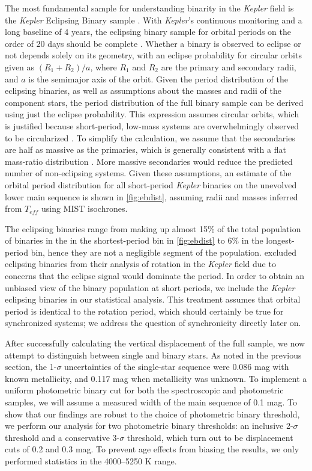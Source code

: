 \documentclass[manuscript]{aastex6}
\newcommand{\Kepler}{\mbox{\textit{Kepler}}}
\newcommand{\Teff}{\ensuremath{T_{eff}}}
\begin{document}
The most fundamental sample for understanding binarity in the \Kepler{} field
is the \Kepler{} Eclipsing Binary sample \citep{Prsa11,Kirk16}. With
\Kepler{}'s continuous monitoring and a long baseline of 4 years, the eclipsing 
binary sample for orbital periods on the order of 20 days should be complete
\citep{Kirk16}.
Whether a binary is observed to eclipse or not depends solely on its geometry,
with an eclipse probability for circular orbits given as \((R_1 + R_2)/a\), where \(R_1\) and 
\(R_2\) are the primary and secondary radii, and \(a\) is the semimajor axis of
the orbit. Given the period distribution of the eclipsing binaries, as well as
assumptions about the masses and radii of the component stars, the period
distribution of the full binary sample can be derived using just the eclipse
probability. This expression assumes circular orbits, which is justified because
short-period, low-mass systems are overwhelmingly observed to be circularized
\citep{Raghavan10,VanEylen16}. To simplify the calculation, we
assume that the secondaries are half as massive as the primaries, which is
generally consistent with a flat mass-ratio distribution \citep{Raghavan10}. 
More massive secondaries would reduce the predicted number of non-eclipsing 
systems. Given these assumptions, an estimate of the orbital period distribution 
for all short-period \Kepler{} binaries on the unevolved lower main sequence is 
shown in \cref{fig:ebdist}, assuming radii and masses inferred from \Teff{} 
using MIST isochrones.

The eclipsing binaries range from making up almost 15\% of the total population 
of binaries in the in the shortest-period bin in \cref{fig:ebdist} to 6\% in the 
longest-period bin, hence they are not a negligible segment of the
population. \citet{McQuillan14} excluded eclipsing binaries from their analysis
of rotation in the \Kepler{} field due to concerns that the eclipse signal would
dominate the period. In order to obtain an unbiased view of the binary
population at short periods, we include the \Kepler{} eclipsing binaries in our
statistical analysis. This treatment assumes that orbital period is identical
to the rotation period, which should certainly be true for synchronized
systems; we address the question of synchronicity directly later on.

After successfully calculating the vertical displacement of the full sample, we
now attempt to distinguish between single and binary stars. As noted in the
previous section, the 1-\(\sigma\) uncertainties of the single-star sequence 
were 0.086 mag with known metallicity, and 0.117 mag when metallicity was unknown. 
To implement a uniform photometric binary cut for both the spectroscopic and
photometric samples, we will assume a measured width of the main sequence of 
0.1 mag. To show that our findings are robust to the choice of photometric
binary threshold, we perform our analysis for two photometric binary thresholds: 
an inclusive 2-\(\sigma\) threshold and a conservative 3-\(\sigma\) threshold,
which turn out to be displacement cuts of 0.2 and 0.3 mag. To prevent age effects 
from biasing the results, we only performed statistics in the 4000--5250 K 
range.
\end{document}
